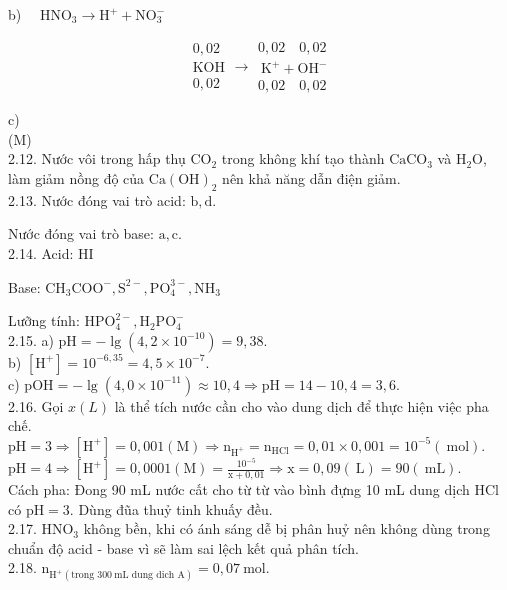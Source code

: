 \documentclass[10pt]{article}
\begin{document}
b) $\quad \mathrm{HNO}_{3} \rightarrow \mathrm{H}^{+}+\mathrm{NO}_{3}^{-}$


\begin{gather*}
0,02  \tag{M}\\
\mathrm{KOH} \\
0,02
\end{gathered} \rightarrow \begin{gathered}
0,02 \quad 0,02 \\
\mathrm{~K}^{+}+\mathrm{OH}^{-} \\
0,02 \quad 0,02
\end{gather*}


c)\\
(M)\\
2.12. Nước vôi trong hấp thụ $\mathrm{CO}_{2}$ trong không khí tạo thành $\mathrm{CaCO}_{3}$ và $\mathrm{H}_{2} \mathrm{O}$, làm giảm nồng độ của $\mathrm{Ca}(\mathrm{OH})_{2}$ nên khả năng dẫn điện giảm.\\
2.13. Nước đóng vai trò acid: $\mathrm{b}, \mathrm{d}$.

Nước đóng vai trò base: $\mathrm{a}, \mathrm{c}$.\\
2.14. Acid: HI

Base: $\mathrm{CH}_{3} \mathrm{COO}^{-}, \mathrm{S}^{2-}, \mathrm{PO}_{4}^{3-}, \mathrm{NH}_{3}$

Lưỡng tính: $\mathrm{HPO}_{4}^{2-}, \mathrm{H}_{2} \mathrm{PO}_{4}^{-}$\\
2.15. a) $\mathrm{pH}=-\lg \left(4,2 \times 10^{-10}\right)=9,38$.\\
b) $\left[\mathrm{H}^{+}\right]=10^{-6,35}=4,5 \times 10^{-7}$.\\
c) $\mathrm{pOH}=-\lg \left(4,0 \times 10^{-11}\right) \approx 10,4 \Rightarrow \mathrm{pH}=14-10,4=3,6$.\\
2.16. Gọi $x(L)$ là thể tích nước cần cho vào dung dịch để thực hiện việc pha chế.\\
$\mathrm{pH}=3 \Rightarrow\left[\mathrm{H}^{+}\right]=0,001(\mathrm{M}) \Rightarrow \mathrm{n}_{\mathrm{H}^{+}}=\mathrm{n}_{\mathrm{HCl}}=0,01 \times 0,001=10^{-5}(\mathrm{~mol})$.\\
$\mathrm{pH}=4 \Rightarrow\left[\mathrm{H}^{+}\right]=0,0001(\mathrm{M})=\frac{10^{-5}}{\mathrm{x}+0,01} \Rightarrow \mathrm{x}=0,09(\mathrm{~L})=90(\mathrm{~mL})$.\\
Cách pha: Đong 90 mL nước cất cho từ từ vào bình đựng 10 mL dung dịch HCl có $\mathrm{pH}=3$. Dùng đũa thuỷ tinh khuấy đều.\\
2.17. $\mathrm{HNO}_{3}$ không bền, khi có ánh sáng dễ bị phân huỷ nên không dùng trong chuẩn độ acid - base vì sẽ làm sai lệch kết quả phân tích.\\
2.18. $\mathrm{n}_{\mathrm{H}^{+}(\text {trong } 300 \mathrm{~mL} \text { dung dich } \mathrm{A})}=0,07 \mathrm{~mol}$.
\end{document}
